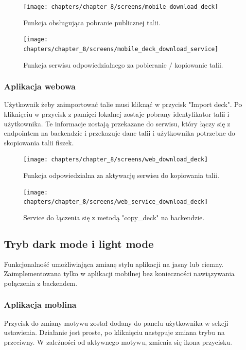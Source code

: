 \begin{figure}[H]
    \centering
    \texttt{[image: chapters/chapter\_8/screens/mobile\_download\_deck]}
    \caption{Funkcja obsługująca pobranie publicznej talii.}
    \label{img:mobile_download_deck}
\end{figure}

\begin{figure}[H]
    \centering
    \texttt{[image: chapters/chapter\_8/screens/mobile\_deck\_download\_service]}
    \caption{Funkcja serwisu odpowiedzialnego za pobieranie / kopiowanie talii.}
    \label{img:mobile_deck_download_service}
\end{figure}

\subsubsection{Aplikacja webowa}
Użytkownik żeby zaimportować talie musi kliknąć w przycisk "Import deck". Po kliknięciu w przycisk z pamięci lokalnej zostaje pobrany identyfikator talii i użytkownika. Te informacje zostają przekazane do serwisu, który łączy się z endpointem na backendzie i przekazuje dane talii i użytkownika potrzebne do skopiowania talii fiszek.

\begin{figure}[H]
    \centering
    \texttt{[image: chapters/chapter\_8/screens/web\_download\_deck]}
    \caption{Funkcja odpowiedzialna za aktywację serwisu do kopiowania talii.}
    \label{img:web_download_deck}
\end{figure}

\begin{figure}[H]
    \centering
    \texttt{[image: chapters/chapter\_8/screens/web\_service\_download\_deck]}
    \caption{Service do łączenia się z metodą "copy\_deck" na backendzie.}
    \label{img:web_service_download_deck}
\end{figure}

\subsection{Tryb dark mode i light mode}
Funkcjonalność umożliwiająca zmianę stylu aplikacji na jasny lub ciemny. Zaimplementowana tylko w aplikacji mobilnej bez konieczności nawiązywania połączenia z backendem.

\subsubsection{Aplikacja moblina}
Przycisk do zmiany motywu został dodany do panelu użytkownika w sekcji ustawienia. Działanie jest proste, po kliknięciu następuje zmiana trybu na przeciwny. W zależności od aktywnego motywu, zmienia się ikona przycisku.

